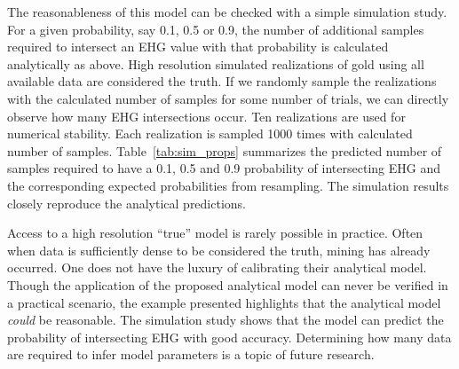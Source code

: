 The reasonableness of this model can be checked with a simple simulation study. For a given probability, say 0.1, 0.5 or 0.9, the number of additional samples required to intersect an EHG value with that probability is calculated analytically as above. High resolution simulated realizations of gold using all available data are considered the truth. If we randomly sample the realizations with the calculated number of samples for some number of trials, we can directly observe how many EHG intersections occur. Ten realizations are used for numerical stability. Each realization is sampled 1000 times with calculated number of samples. Table~\ref{tab:sim_props} summarizes the predicted number of samples required to have a 0.1, 0.5 and 0.9 probability of intersecting EHG and the corresponding expected probabilities from resampling. The simulation results closely reproduce the analytical predictions. 



Access to a high resolution ``true'' model is rarely possible in practice. Often when data is sufficiently dense to be considered the truth, mining has already occurred. One does not have the luxury of calibrating their analytical model. Though the application of the proposed analytical model can never be verified in a practical scenario, the example presented highlights that the analytical model \emph{could} be reasonable. The simulation study shows that the model can predict the probability of intersecting EHG with good accuracy. Determining how many data are required to infer model parameters is a topic of future research. 